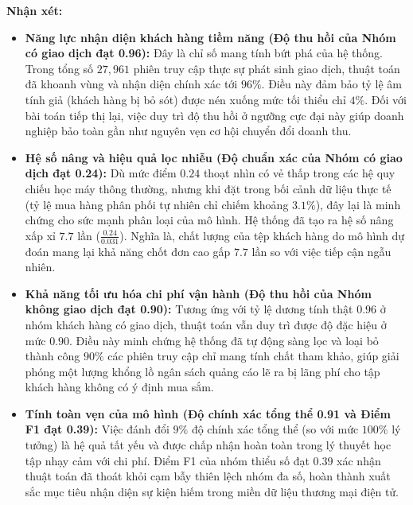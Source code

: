 \documentclass[a4paper,11pt]{article}
\begin{document}
\textbf{Nhận xét:}

\begin{itemize}
    \item \textbf{Năng lực nhận diện khách hàng tiềm năng (Độ thu hồi của Nhóm có giao dịch đạt 0.96):} Đây là chỉ số mang tính bứt phá của hệ thống. Trong tổng số $27,961$ phiên truy cập thực sự phát sinh giao dịch, thuật toán đã khoanh vùng và nhận diện chính xác tới $96\%$. Điều này đảm bảo tỷ lệ âm tính giả (khách hàng bị bỏ sót) được nén xuống mức tối thiểu chỉ $4\%$. Đối với bài toán tiếp thị lại, việc duy trì độ thu hồi ở ngưỡng cực đại này giúp doanh nghiệp bảo toàn gần như nguyên vẹn cơ hội chuyển đổi doanh thu.
    
    \item \textbf{Hệ số nâng và hiệu quả lọc nhiễu (Độ chuẩn xác của Nhóm có giao dịch đạt 0.24):} Dù mức điểm $0.24$ thoạt nhìn có vẻ thấp trong các hệ quy chiếu học máy thông thường, nhưng khi đặt trong bối cảnh dữ liệu thực tế (tỷ lệ mua hàng phân phối tự nhiên chỉ chiếm khoảng $3.1\%$), đây lại là minh chứng cho sức mạnh phân loại của mô hình. Hệ thống đã tạo ra hệ số nâng xấp xỉ $7.7$ lần ($\frac{0.24}{0.031}$). Nghĩa là, chất lượng của tệp khách hàng do mô hình dự đoán mang lại khả năng chốt đơn cao gấp $7.7$ lần so với việc tiếp cận ngẫu nhiên.
    
    \item \textbf{Khả năng tối ưu hóa chi phí vận hành (Độ thu hồi của Nhóm không giao dịch đạt 0.90):} Tương ứng với tỷ lệ dương tính thật $0.96$ ở nhóm khách hàng có giao dịch, thuật toán vẫn duy trì được độ đặc hiệu ở mức $0.90$. Điều này minh chứng hệ thống đã tự động sàng lọc và loại bỏ thành công $90\%$ các phiên truy cập chỉ mang tính chất tham khảo, giúp giải phóng một lượng khổng lồ ngân sách quảng cáo lẽ ra bị lãng phí cho tập khách hàng không có ý định mua sắm.
    
    \item \textbf{Tính toàn vẹn của mô hình (Độ chính xác tổng thể 0.91 và Điểm F1 đạt 0.39):} Việc đánh đổi $9\%$ độ chính xác tổng thể (so với mức $100\%$ lý tưởng) là hệ quả tất yếu và được chấp nhận hoàn toàn trong lý thuyết học tập nhạy cảm với chi phí. Điểm F1 của nhóm thiểu số đạt $0.39$ xác nhận thuật toán đã thoát khỏi cạm bẫy thiên lệch nhóm đa số, hoàn thành xuất sắc mục tiêu nhận diện sự kiện hiếm trong miền dữ liệu thương mại điện tử.
\end{itemize}
\end{document}
